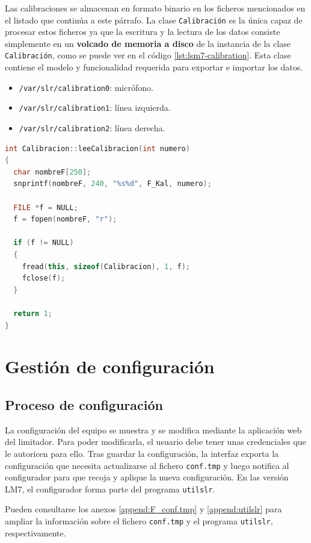 Las calibraciones se almacenan en formato binario en los ficheros mencionados en el listado que continúa a este párrafo. La clase \verb|Calibración| es la única capaz de procesar estos ficheros ya que la escritura y la lectura de los datos consiste simplemente en un \textbf{volcado de memoria a disco} de la instancia de la clase \verb|Calibración|, como se puede ver en el código  \ref{lst:lsm7-calibration}. Esta clase contiene el modelo y funcionalidad requerida para exportar e importar los datos.
\begin{itemize}
	 \item \verb|/var/slr/calibration0|: micrófono.
	 \item \verb|/var/slr/calibration1|: línea izquierda.
	 \item \verb|/var/slr/calibration2|: línea derecha.
\end{itemize}

\begin{lstlisting}[language=c++, label={lst:lsm7-calibration}, caption={Lectura de calibración desde fichero.}]
int Calibracion::leeCalibracion(int numero)
{
  char nombreF[250];
  snprintf(nombreF, 240, "%s%d", F_Kal, numero);

  FILE *f = NULL;
  f = fopen(nombreF, "r");

  if (f != NULL)
  {
    fread(this, sizeof(Calibracion), 1, f);
    fclose(f);
  }

  return 1;
}
\end{lstlisting}


\section{Gestión de configuración} \label{sec:lms7-config}

\subsection{Proceso de configuración}

La configuración del equipo se muestra y se modifica mediante la aplicación web del limitador. Para poder modificarla, el usuario debe tener unas credenciales que le autoricen para ello. Tras guardar la configuración, la interfaz exporta la configuración que necesita actualizarse al fichero \verb|conf.tmp| y luego notifica al configurador para que recoja y aplique la nueva configuración. En las versión \acrshort{LM7}, el configurador forma parte del programa \verb|utilslr|.

Pueden consultarse los anexos \ref{append:F_conf.tmp} y \ref{append:utilslr} para ampliar la información sobre el fichero \verb|conf.tmp| y el programa \verb|utilslr|, respectivamente.

